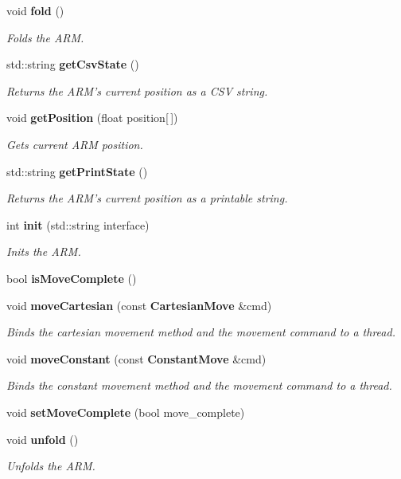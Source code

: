 \begin{DoxyCompactItemize}
\item 
void {\bf fold} ()
\begin{DoxyCompactList}\small\item\em \-Folds the \-A\-R\-M. \end{DoxyCompactList}\item 
std\-::string {\bf get\-Csv\-State} ()
\begin{DoxyCompactList}\small\item\em \-Returns the \-A\-R\-M's current position as a \-C\-S\-V string. \end{DoxyCompactList}\item 
void {\bf get\-Position} (float position[$\,$])
\begin{DoxyCompactList}\small\item\em \-Gets current \-A\-R\-M position. \end{DoxyCompactList}\item 
std\-::string {\bf get\-Print\-State} ()
\begin{DoxyCompactList}\small\item\em \-Returns the \-A\-R\-M's current position as a printable string. \end{DoxyCompactList}\item 
int {\bf init} (std\-::string interface)
\begin{DoxyCompactList}\small\item\em \-Inits the \-A\-R\-M. \end{DoxyCompactList}\item 
bool {\bf is\-Move\-Complete} ()
\item 
void {\bf move\-Cartesian} (const {\bf \-Cartesian\-Move} \&cmd)
\begin{DoxyCompactList}\small\item\em \-Binds the cartesian movement method and the movement command to a thread. \end{DoxyCompactList}\item 
void {\bf move\-Constant} (const {\bf \-Constant\-Move} \&cmd)
\begin{DoxyCompactList}\small\item\em \-Binds the constant movement method and the movement command to a thread. \end{DoxyCompactList}\item 
void {\bf set\-Move\-Complete} (bool move\-\_\-complete)
\item 
void {\bf unfold} ()
\begin{DoxyCompactList}\small\item\em \-Unfolds the \-A\-R\-M. \end{DoxyCompactList}\end{DoxyCompactItemize}
